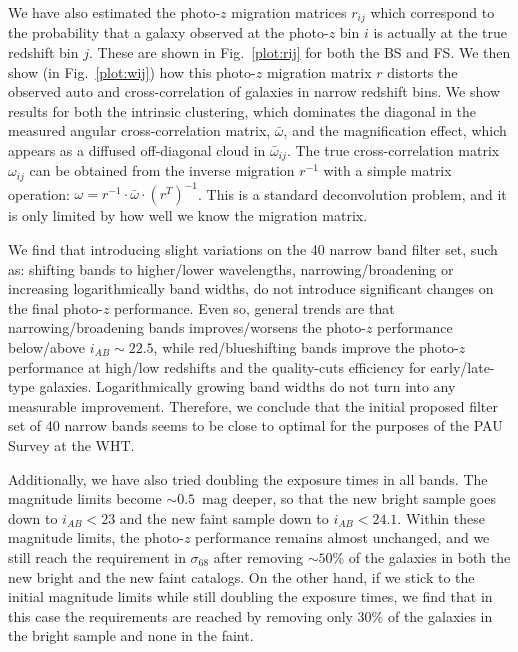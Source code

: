 We have also estimated the photo-$z$ migration matrices $r_{ij}$ which correspond to the probability
 that a galaxy observed at the photo-$z$ bin $i$ is actually at the true redshift bin $j$.
These are shown  in Fig.~\ref{plot:rij} for both the BS and FS.  We then show (in Fig.~\ref{plot:wij})
how this photo-$z$ migration matrix $r$ distorts the observed auto and cross-correlation of galaxies in narrow redshift bins.
 We show results for both the intrinsic clustering, which dominates the diagonal in the measured angular 
cross-correlation matrix,  $\bar{\omega}$, and the magnification effect, which appears as a diffused
off-diagonal cloud in $\bar{\omega}_{ij}$. The true cross-correlation matrix $\omega_{ij}$ 
can be obtained from the inverse migration $r^{-1}$  with a simple matrix operation: 
$\omega = r^{-1}\cdot\bar{\omega}\cdot(r^T)^{-1}$. This is a standard deconvolution problem, and it is only limited
by how well we know the migration matrix.

We find that introducing slight variations on the 40 narrow band filter set, such as: shifting bands to higher/lower wavelengths, narrowing/broadening or increasing logarithmically band widths, do not introduce significant changes on the final photo-$z$ performance.  Even so, general trends are that narrowing/broadening bands improves/worsens the photo-$z$ performance below/above $i_{AB}\sim22.5$, while red/blueshifting bands improve the photo-$z$ performance at high/low redshifts and the quality-cuts efficiency for early/late-type galaxies. Logarithmically growing band widths do not turn into any measurable improvement. Therefore, we conclude that the initial proposed filter set of 40 narrow bands seems to be close to optimal for the purposes of the PAU Survey at the WHT.

Additionally, we have also tried doubling the exposure times in all bands. The magnitude limits become $\sim0.5$~mag deeper, so that the new bright sample goes down to $i_{AB}<23$ and the new faint sample down to $i_{AB}<24.1$. Within these magnitude limits, the photo-$z$ performance remains almost unchanged, and we still reach the requirement in $\sigma_{68}$ after removing $\sim50$\% of the galaxies in both the new bright and the new faint catalogs. On the other hand, if we stick to the initial magnitude limits while still doubling the exposure times, we find that in this case the requirements are reached by removing only 30\% of the galaxies in the bright sample and none in the faint.
